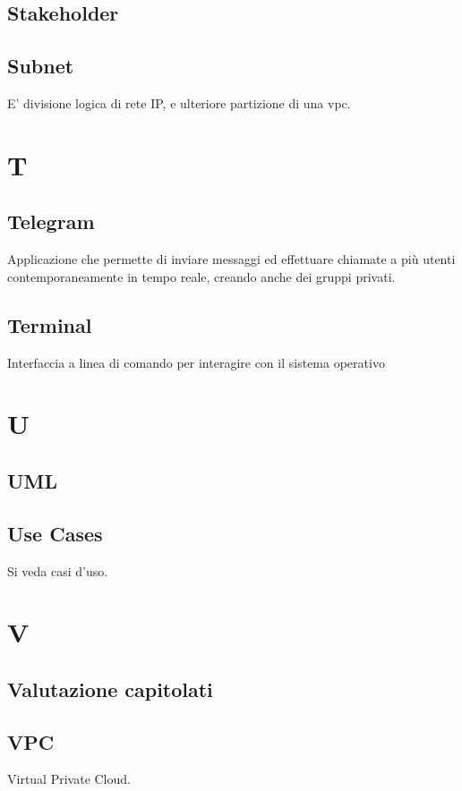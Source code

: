 \documentclass{classes/base}
\begin{document}
        \subsection*{Stakeholder} 

        \subsection*{Subnet}
        E' divisione logica di rete IP, e ulteriore partizione di una vpc.
        \newpage  
    \section*{T}
        \subsection*{Telegram}
        Applicazione che permette di inviare messaggi ed effettuare chiamate a più utenti contemporaneamente in tempo reale, creando anche dei gruppi privati.

        \subsection*{Terminal} 
        Interfaccia a linea di comando per interagire con il sistema operativo 
        \newpage  
    \section*{U}
        \subsection*{UML}

        \subsection*{Use Cases} 
        Si veda casi d’uso.
        \newpage  
    \section*{V}
        \subsection*{Valutazione capitolati}

        \subsection*{VPC}
        Virtual Private Cloud.
        \newpage  
\end{document}
